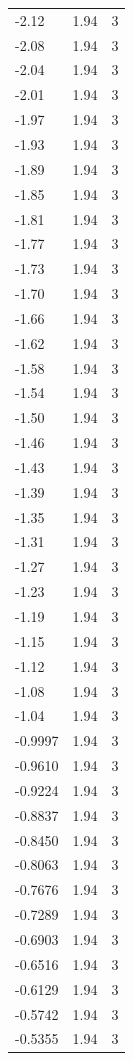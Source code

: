 \begin{longtable}{lrr}
  -2.12 & 1.94 & 3 \\
  -2.08 & 1.94 & 3 \\
  -2.04 & 1.94 & 3 \\
  -2.01 & 1.94 & 3 \\
  -1.97 & 1.94 & 3 \\
  -1.93 & 1.94 & 3 \\
  -1.89 & 1.94 & 3 \\
  -1.85 & 1.94 & 3 \\
  -1.81 & 1.94 & 3 \\
  -1.77 & 1.94 & 3 \\
  -1.73 & 1.94 & 3 \\
  -1.70 & 1.94 & 3 \\
  -1.66 & 1.94 & 3 \\
  -1.62 & 1.94 & 3 \\
  -1.58 & 1.94 & 3 \\
  -1.54 & 1.94 & 3 \\
  -1.50 & 1.94 & 3 \\
  -1.46 & 1.94 & 3 \\
  -1.43 & 1.94 & 3 \\
  -1.39 & 1.94 & 3 \\
  -1.35 & 1.94 & 3 \\
  -1.31 & 1.94 & 3 \\
  -1.27 & 1.94 & 3 \\
  -1.23 & 1.94 & 3 \\
  -1.19 & 1.94 & 3 \\
  -1.15 & 1.94 & 3 \\
  -1.12 & 1.94 & 3 \\
  -1.08 & 1.94 & 3 \\
  -1.04 & 1.94 & 3 \\
  -0.9997 & 1.94 & 3 \\
  -0.9610 & 1.94 & 3 \\
  -0.9224 & 1.94 & 3 \\
  -0.8837 & 1.94 & 3 \\
  -0.8450 & 1.94 & 3 \\
  -0.8063 & 1.94 & 3 \\
  -0.7676 & 1.94 & 3 \\
  -0.7289 & 1.94 & 3 \\
  -0.6903 & 1.94 & 3 \\
  -0.6516 & 1.94 & 3 \\
  -0.6129 & 1.94 & 3 \\
  -0.5742 & 1.94 & 3 \\
  -0.5355 & 1.94 & 3 \\

\end{longtable}
